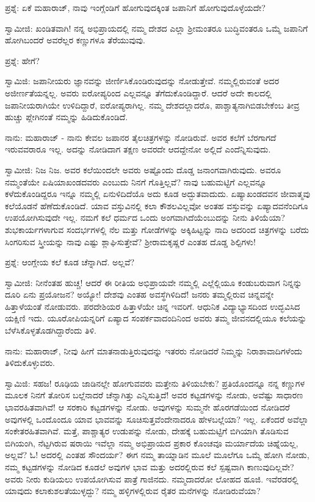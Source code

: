ಪ್ರಶ್ನೆ: ಏಕೆ ಮಹಾರಾಜ್, ನಾವು ಇಂಗ್ಲೆಂಡಿಗೆ ಹೋಗುವುದಕ್ಕಿಂತ ಜಪಾನಿಗೆ ಹೋಗುವುದೊಳ್ಳೆಯದೇ?

ಸ್ವಾಮೀಜಿ: ಖಂಡಿತವಾಗಿ! ನನ್ನ ಅಭಿಪ್ರಾಯದಲ್ಲಿ ನಮ್ಮ ದೇಶದ ಎಲ್ಲಾ ಶ‍್ರೀಮಂತರೂ ಬುದ್ಧಿವಂತರೂ ಒಮ್ಮೆ ಜಪಾನಿಗೆ ಹೋಗಿಬಂದರೆ ಅವರೆಲ್ಲರ ಕಣ್ಣುಗಳೂ ತೆರೆಯುವುವು.

ಪ್ರಶ್ನೆ: ಹೇಗೆ?

ಸ್ವಾಮಿಜಿ: ಜಪಾನೀಯರು ಜ್ಞಾನವನ್ನು ಜೀರ್ಣಿಸಿಕೊಂಡಿರುವುದನ್ನು ನೋಡುತ್ತೇವೆ. ನಮ್ಮಲ್ಲಿರುವಂತೆ ಅದರ ಅಜೀರ್ಣತೆಯನ್ನಲ್ಲ. ಅವರು ಐರೋಪ್ಯರಿಂದ ಎಲ್ಲವನ್ನೂ ತೆಗೆದುಕೊಂಡಿದ್ದಾರೆ. ಆದರೆ ಅದೇ ಕಾಲದಲ್ಲಿ ಜಪಾನೀಯರಾಗಿಯೇ ಉಳಿದಿದ್ದಾರೆ, ಐರೋಪ್ಯರಾಗಿಲ್ಲ. ನಮ್ಮ ದೇಶದಲ್ಲಾದರೊ, ಪಾಶ್ಚಾತ್ಯನಾಗಿಬಿಡಬೇಕೆಂಬ ತೀವ್ರ ಹುಚ್ಚು ಪ್ಲೇಗಿನಂತೆ ನಮ್ಮನ್ನು ಹಿಡಿದುಕೊಂಡಿದೆ.

ನಾನು: ಮಹಾರಾಜ್ - ನಾನು ಕೇವಲ ಜಪಾನರ ತೈಲಚಿತ್ರಗಳನ್ನು ನೋಡಿರುವೆ. ಅವರ ಕಲೆಗೆ ಬೆರಗಾಗದೆ ಇರುವವರಾರೂ ಇಲ್ಲ. ಅದನ್ನು ನೋಡಿದಾಗ ತಕ್ಷಣ ಅವರದೇ ಆದದ್ದೇನೋ ಅಲ್ಲಿದೆ ಎಂದೆನ್ನಿಸುವುದು.

ಸ್ವಾಮೀಜಿ: ನಿಜ ನಿಜ. ಅವರ ಕಲೆಯಿಂದಲೇ ಅವರು ಅಷ್ಟೊಂದು ದೊಡ್ಡ ಜನಾಂಗವಾಗಿರುವುದು. ಅವರೂ ನಮ್ಮಂತೆಯೇ ಏಷಿಯಾಖಂಡದವರು ಎಂಬುದು ನಿನಗೆ ಗೊತ್ತಿಲ್ಲವೆ? ನಾವು ಬಹುಮಟ್ಟಿಗೆ ಎಲ್ಲವನ್ನೂ ಕಳೆದುಕೊಂಡಿದ್ದರೂ ಇನ್ನೂ ನಮ್ಮಲ್ಲಿ ಏನುಳಿದಿದೆಯೊ ಅದು ಕೂಡ ಅದ್ಭುತವಾದುದು. ಏಷ್ಯಾಖಂಡದವನ ಜೀವಾತ್ಮವು ಕಲೆಯೊಡನೆ ಹೆಣೆದುಕೊಂಡಿದೆ. ಯಾವ ವಸ್ತುವಿನಲ್ಲಿ ಕಲಾ ಕೌಶಲವಿಲ್ಲವೋ ಅಂತಹ ವಸ್ತುವನ್ನು ಏಷ್ಯಾದವನೆಂದಿಗೂ ಉಪಯೋಗಿಸುವುದೇ ಇಲ್ಲ. ನಮಗೆ ಕಲೆ ಧರ್ಮದ ಒಂದು ಅಂಗವಾಗಿದೆಯೆಂಬುದನ್ನು ನೀನು ತಿಳಿಯೆಯಾ? ಶುಭಕಾರ್ಯಗಳಾಗುವ ಸಂದರ್ಭಗಳಲ್ಲಿ ನೆಲ ಮತ್ತು ಗೋಡೆಗಳನ್ನು ಅಕ್ಕಿಹಿಟ್ಟನ್ನು ನಾದಿ ಅದರಿಂದ ಚಿತ್ರಗಳನ್ನು ಬರೆದು ಸಿಂಗರಿಸುವ ಸ್ತ್ರೀಯನ್ನು ನಾವು ಎಷ್ಟು ಶ್ಲಾಘಿಸುತ್ತೇವೆ? ಶ‍್ರೀರಾಮಕೃಷ್ಣರೆ ಎಂತಹ ದೊಡ್ಡ ಶಿಲ್ಪಿಗಳು!

ಪ್ರಶ್ನೆ: ಆಂಗ್ಲೇಯ ಕಲೆ ಕೂಡ ಚೆನ್ನಾಗಿದೆ. ಅಲ್ಲವೆ?

ಸ್ವಾಮೀಜಿ: ನೀನೆಂತಹ ಹುಚ್ಚ! ಆದರೆ ಈ ರೀತಿಯ ಅಭಿಪ್ರಾಯವೇ ನಮ್ಮಲ್ಲಿ ಎಲ್ಲೆಲ್ಲಿಯೂ ಕಂಡುಬರುವಾಗ ನಿನ್ನನ್ನು ದೂರಿ ಏನು ಪ್ರಯೋಜನ? ಅಯ್ಯೋ! ದೇಶವು ಎಂತಹ ಅವಸ್ಥೆಗಿಳಿದಿದೆ! ಜನರು ತಮ್ಮಲ್ಲಿರುವ ಚಿನ್ನವನ್ನೇ ಹಿತ್ತಾಳೆಯಂತೆ ನೋಡುವರು. ಪರದೇಶಿಯರ ಹಿತ್ತಾಳೆಯೇ ಚಿನ್ನ ಇವರಿಗೆ. ಆಧುನಿಕ ವಿದ್ಯಾಭ್ಯಾಸದಿಂದ ಉದ್ಭವಿಸಿದ ಯಕ್ಷಿಣಿ ಇದು. ಯೂರೋಪಿಯನ್ನರಿಗೆ ಏಷ್ಯಾದ ಸಂಪರ್ಕವಾದಂದಿನಿಂದ ಅವರು ತಮ್ಮ ಜೀವನದಲ್ಲಿಯೂ ಕಲೆಯನ್ನು ಬೆಳೆಸಿಕೊಳ್ಳತೊಡಗಿದ್ದಾರೆಂದು ತಿಳಿ.

ನಾನು: ಮಹಾರಾಜ್, ನೀವು ಹೀಗೆ ಮಾತನಾಡುತ್ತಿರುವುದನ್ನು ಇತರರು ನೋಡಿದರೆ ನಿಮ್ಮನ್ನು ನಿರಾಶಾವಾದಿಗಳೆಂದು ತಿಳಿದುಕೊಳ್ಳುವರು.

ಸ್ವಾಮಿಜಿ: ಸಹಜ! ರೂಢಿಯ ಜಾಡಿನಲ್ಲೇ ಹೋಗುವವರು ಮತ್ತೇನು ತಿಳಿಯಬೇಕು? ಪ್ರತಿಯೊಂದನ್ನೂ ನನ್ನ ಕಣ್ಣುಗಳ ಮೂಲಕ ನಿನಗೆ ತೋರಿಸ ಬಲ್ಲೆನಾದರೆ ಚೆನ್ನಾಗಿತ್ತು ಎನ್ನಿಸುತ್ತಿದೆ! ಅವರ ಕಟ್ಟಡಗಳನ್ನು ನೋಡು, ಅವೆಷ್ಟು ಸಾಧಾರಣ ಭಾವರಹಿತವಾಗಿವೆ! ಆ ಸರಕಾರಿ ಕಟ್ಟಡಗಳನ್ನು ನೋಡು. ಅವುಗಳನ್ನು ಸುಮ್ಮನೇ ಹೊರಗಡೆಯಿಂದ ನೋಡಿದರೆ ಅವುಗಳಲ್ಲಿ ಒಂದೊಂದೂ ಯಾವ ಭಾವವನ್ನು ಸೂಚಿಸುತ್ತವೆಂದೇನಾದರೂ ಹೇಳಬಲ್ಲೆಯಾ? ಇಲ್ಲ. ಏಕೆಂದರೆ ಅವೆಲ್ಲಾ ಸಂಕೇತರಹಿತವಾಗಿವೆ. ಮತ್ತೆ, ಪಾಶ್ಚಾತ್ಯರ ಉಡುಪನ್ನು ನೋಡು, ದೇಹಕ್ಕೆ ಬಹುಮಟ್ಟಿಗೆ ಬಿಗಿಯಾಗಿ ತೊಡಿಸುವ ಬಿಗಿಯಂಗಿ, ನೆಟ್ಟಗಿರುವ ಷರಾಯಿ ಇವೆಲ್ಲಾ ನಮ್ಮ ಅಭಿಪ್ರಾಯದ ಪ್ರಕಾರ ಕೊಂಚವೂ ಮರ್ಯಾದೆಯ ಚಿಹ್ನೆಯಲ್ಲ, ಅಲ್ಲವೆ? ಓ! ಅದರಲ್ಲಿ ಎಂತಹ ಸೌಂದರ್ಯ? ಈಗ ನಮ್ಮ ತಾಯ್ನಾಡಿನ ಮೂಲೆ ಮೂಲೆಗೂ ಒಮ್ಮೆ ಹೋಗಿ ನೋಡು, ನಮ್ಮ ಕಟ್ಟಡಗಳನ್ನು ನೋಡಿದ ಕೂಡಲೆ ಅವುಗಳ ಭಾವ ಮತ್ತು ಅದರಲ್ಲಿರುವ ಕಲೆ ಸ್ಪಷ್ಟವಾಗಿ ಕಾಣುವುದಿಲ್ಲವೇ? ಅವರು ನೀರು ಕುಡಿಯಲು ಉಪಯೋಗಿಸುವ ಪಾತ್ರೆ ಗಾಜಿನದು. ನಮ್ಮದಾದರೋ ಲೋಹದ ಹೂಜಿ. ಇವೆರಡರಲ್ಲಿ ಯಾವುದು ಕಲಾಕುಶಲತೆಯುಳ್ಳದ್ದು? ನಮ್ಮ ಹಳ್ಳಿಗಳಲ್ಲಿರುವ ರೈತರ ಮನೆಗಳನ್ನು ನೋಡಿರುವೆಯಾ?

